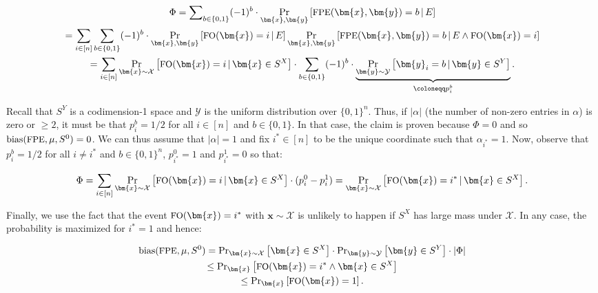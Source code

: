 \[\begin{gathered}
\displaystyle\Phi \displaystyle=\sum\nolimits_{b\in\{0,1\}}(-1)^{b}\cdot\Pr_{\bm{x},\bm{y}}\left[{\textrm{\small{FPE}}}(\bm{x},\bm{y})=b\,|\,E\right] \\
\displaystyle=\sum_{i\in[n]}\sum_{b\in\{0,1\}}(-1)^{b}\cdot\Pr_{\bm{x},\bm{y}}\left[{\textrm{\small{FO}}}(\bm{x})=i\,|\,E\right]\Pr_{\bm{x},\bm{y}}\left[{\textrm{\small{FPE}}}(\bm{x},\bm{y})=b\,|\,E\wedge{\textrm{\small{FO}}}(\bm{x})=i\right] \\
\displaystyle=\sum_{i\in[n]}\Pr_{\bm{x}\sim\mathcal{X}}\left[{\textrm{\small{FO}}}(\bm{x})=i\,|\,\bm{x}\in S^{X}\right]\cdot\sum_{b\in\{0,1\}}(-1)^{b}\cdot\underbrace{\Pr_{\bm{y}\sim\mathcal{Y}}\left[\bm{y}_{i}=b\,|\,\bm{y}\in S^{Y}\right]}_{\coloneqq p_{i}^{b}}.
\end{gathered}\]


Recall that $S^{Y}$ is a codimension-1 space and $\mathcal{Y}$ is the uniform distribution over $\{0,1\}^{n}$. Thus, if $|\alpha|$ (the number of non-zero entries in $\alpha$) is zero or $\geq 2$, it must be that $p_{i}^{b}=1/2$ for all $i\in[n]$ and $b\in\{0,1\}$. In that case, the claim is proven because $\Phi=0$ and so ${\textup{bias}}({\textrm{\small{FPE}}},\mu,S^{0})=0$. We can thus assume that $|\alpha|=1$ and fix $i^{*}\in[n]$ to be the unique coordinate such that $\alpha_{i^{*}}=1$. Now, observe that $p_{i}^{b}=1/2$ for all $i\neq i^{*}$ and $b\in\{0,1\}^{n}$, $p_{i^{*}}^{0}=1$ and $p_{i^{*}}^{1}=0$ so that:\par


\[\begin{gathered}
\Phi=\sum_{i\in[n]}\Pr_{\bm{x}\sim\mathcal{X}}\left[{\textrm{\small{FO}}}(\bm{x})=i\,|\,\bm{x}\in S^{X}\right]\cdot(p_{i}^{0}-p_{i}^{1})=\Pr_{\bm{x}\sim\mathcal{X}}\left[{\textrm{\small{FO}}}(\bm{x})=i^{*}\,|\,\bm{x}\in S^{X}\right].
\end{gathered}\]


Finally, we use the fact that the event ${\textrm{\small{FO}}}(\bm{x})=i^{*}$ with $\bm{x}\sim\mathcal{X}$ is unlikely to happen if $S^{X}$ has large mass under $\mathcal{X}$. In any case, the probability is maximized for $i^{*}=1$ and hence:\par


\[\begin{gathered}
\displaystyle{\textup{bias}}({\textrm{\small{FPE}}},\mu,S^{0}) \displaystyle=\Pr\nolimits_{\bm{x}\sim\mathcal{X}}\left[\bm{x}\in S^{X}\right]\cdot\Pr\nolimits_{\bm{y}\sim\mathcal{Y}}\left[\bm{y}\in S^{Y}\right]\cdot|\Phi| \\
\displaystyle\leq\Pr\nolimits_{\bm{x}}\left[{\textrm{\small{FO}}}(\bm{x})=i^{*}\wedge\bm{x}\in S^{X}\right] \\
\displaystyle\leq\Pr\nolimits_{\bm{x}}\left[{\textrm{\small{FO}}}(\bm{x})=1\right].
\end{gathered}\]


